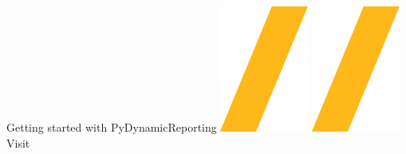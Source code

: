 \documentclass[9pt,landscape]{article}
\begin{document}
\vspace{-0.15cm}
\noindent\makebox[\linewidth]{\rule{\paperwidth}{4pt}}
\begin{center}
Getting started with PyDynamicReporting \includegraphics[height=\fontcharht\font`\S]{slash.png} \href{https://github.com/ansys/pydynamicreporting}{\color{blue}{PyAnsys on GitHub}} \includegraphics[height=\fontcharht\font`\S]{slash.png} Visit 
\end{center}
\end{document}
